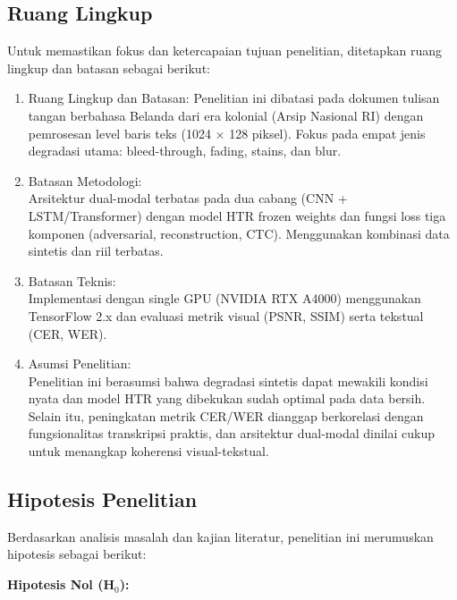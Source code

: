 \documentclass[12pt,a4paper]{article}
\begin{document}
\subsection{Ruang Lingkup}
\label{subsec:ruang-lingkup}

Untuk memastikan fokus dan ketercapaian tujuan penelitian, ditetapkan ruang lingkup dan batasan sebagai berikut:

\begin{enumerate}[label=\arabic*., leftmargin=0.5cm]
    \item Ruang Lingkup dan Batasan:
    Penelitian ini dibatasi pada dokumen tulisan tangan berbahasa Belanda dari era kolonial (Arsip Nasional RI) dengan pemrosesan level baris teks (1024 × 128 piksel). Fokus pada empat jenis degradasi utama: bleed-through, fading, stains, dan blur.


    \item Batasan Metodologi: \\
    Arsitektur dual-modal terbatas pada dua cabang (CNN + LSTM/Transformer) dengan model HTR frozen weights dan fungsi loss tiga komponen (adversarial, reconstruction, CTC). Menggunakan kombinasi data sintetis dan riil terbatas.


    \item Batasan Teknis: \\
    Implementasi dengan single GPU (NVIDIA RTX A4000) menggunakan TensorFlow 2.x dan evaluasi metrik visual (PSNR, SSIM) serta tekstual (CER, WER).


    \item Asumsi Penelitian:\\
    Penelitian ini berasumsi bahwa degradasi sintetis dapat mewakili kondisi nyata dan model HTR yang dibekukan sudah optimal pada data bersih. Selain itu, peningkatan metrik CER/WER dianggap berkorelasi dengan fungsionalitas transkripsi praktis, dan arsitektur dual-modal dinilai cukup untuk menangkap koherensi visual-tekstual.
\end{enumerate}

\vspace{0.8em}
\subsection{Hipotesis Penelitian}
\label{subsec:hipotesis}

Berdasarkan analisis masalah dan kajian literatur, penelitian ini merumuskan hipotesis sebagai berikut:

\vspace{0.5em}
\textbf{Hipotesis Nol (H$_0$):}
\end{document}
